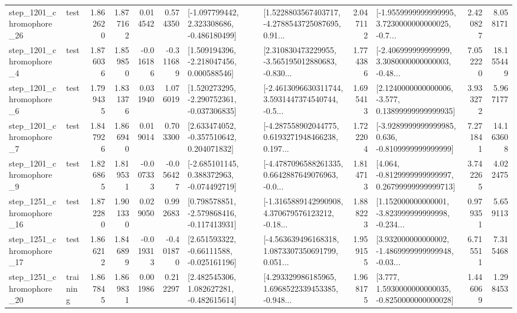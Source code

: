 \begin{tabular}{llrrrrllrlrr}
 step\_1201\_chromophore\_26 &      test &      1.862620 &    1.877162 &      0.014542 &  0.574350 &   [-1.097799442, 2.323308686, -0.486180499] &  [1.5228803567403717, -4.2788543725087695, 0.91... &       2.047112 &  [-1.9559999999999995, 3.7230000000000025, -0.7... &            2.420827 &          8.058171 \\
  step\_1201\_chromophore\_4 &      test &      1.876036 &    1.859850 &     -0.016186 & -0.311689 &    [1.509194396, -2.218047456, 0.000588546] &  [2.310830473229955, -3.565195012880683, -0.830... &       1.774386 &  [-2.406999999999999, 3.3080000000000003, -0.48... &            7.052220 &         18.155449 \\
  step\_1201\_chromophore\_6 &      test &      1.799435 &    1.831376 &      0.031940 &  1.076019 &   [1.520273295, -2.290752361, -0.037306835] &  [-2.4613096630311744, 3.5931447374540744, -0.5... &       1.695413 &  [2.1240000000000006, -3.577, 0.13899999999999935] &            3.933272 &          5.967177 \\
  step\_1201\_chromophore\_7 &      test &      1.847926 &    1.866940 &      0.019014 &  0.703300 &    [2.633474052, -0.357510642, 0.204071832] &  [-4.287558902044775, 0.6193271948466238, 0.197... &       1.722204 &  [-3.9289999999999985, 0.636, -0.8109999999999999] &            7.271841 &         14.163608 \\
  step\_1201\_chromophore\_9 &      test &      1.826865 &    1.819531 &     -0.007333 & -0.056427 &   [-2.685101145, 0.388372963, -0.074492719] &  [-4.4787096588261335, 0.6642887649076963, -0.0... &       1.814713 &  [4.064, -0.8129999999999997, 0.26799999999999713] &            3.742265 &          4.022475 \\
 step\_1251\_chromophore\_16 &      test &      1.872280 &    1.901330 &      0.029050 &  0.992683 &   [0.798578851, -2.579868416, -0.117413931] &  [-1.3165889142990908, 4.370679576123212, -0.18... &       1.888223 &  [1.152000000000001, -3.823999999999998, -0.234... &            0.979351 &          5.659113 \\
 step\_1251\_chromophore\_17 &      test &      1.866212 &    1.846899 &     -0.019313 & -0.401870 &    [2.651593322, -0.66111588, -0.025161196] &  [-4.563639496168318, 1.0873307350691799, 0.051... &       1.959155 &  [3.932000000000002, -1.4869999999999948, -0.03... &            6.715511 &          7.315468 \\
 step\_1251\_chromophore\_20 &  training &      1.867845 &    1.869831 &      0.001986 &  0.212297 &    [2.482545306, 1.082627281, -0.482615614] &  [4.293329986185965, 1.6968522339453385, -0.948... &       1.968175 &   [3.777, 1.5930000000000035, -0.8250000000000028] &            1.446069 &          1.298453 \\

\end{tabular}
